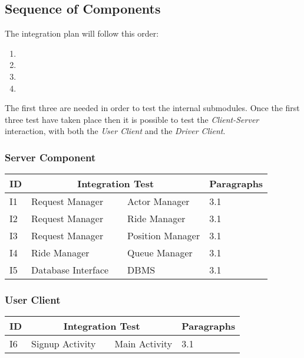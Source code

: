 \subsection{Sequence of Components} %
\label{sub:sequence_of_components}
The integration plan will follow this order:
\begin{enumerate}
	\item {}
	\item {}
	\item {}
	\item {}
\end{enumerate}

The first three are needed in order to test the internal submodules. Once the first three test have taken place then it is possible to test the \emph{Client-Server} interaction, with both the \emph{User Client} and the \emph{Driver Client}.

\subsubsection{Server Component} %
\label{ssub:server_component}

\begin{tabular} { p{20.0pt} | p{135pt} p{20pt} p{100pt} | p{60pt} } \hline
	\textbf{ID} & \multicolumn {3}{|c|}{\textbf{Integration Test}} & \textbf{Paragraphs} \\ \hline
	I1 & Request Manager & \textrightarrow & Actor Manager & 3.1 \\ \hline
	I2 & Request Manager & \textrightarrow & Ride Manager & 3.1 \\ \hline
	I3 & Request Manager & \textrightarrow & Position Manager & 3.1 \\ \hline
	I4 & Ride Manager & \textrightarrow & Queue Manager & 3.1 \\ \hline
	I5 & Database Interface & \textrightarrow & DBMS & 3.1 \\ \hline
\end{tabular}

\subsubsection{User Client} %
\label{ssub:user_client}

\begin{tabular} { p{20.0pt} | p{135pt} p{20pt} p{100pt} | p{60pt} } \hline
	\textbf{ID} & \multicolumn {3}{|c|}{\textbf{Integration Test}} & \textbf{Paragraphs} \\ \hline
	I6 & Signup Activity & \textrightarrow & Main Activity & 3.1 \\ \hline
\end{tabular}

